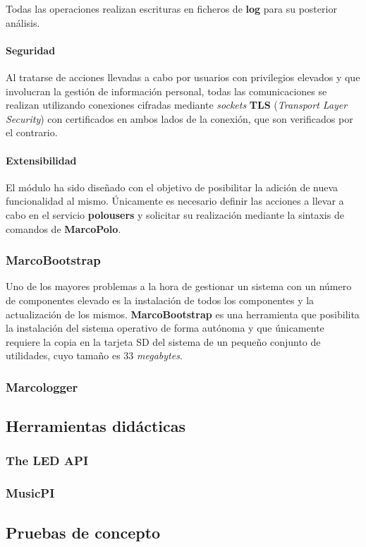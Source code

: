 Todas las operaciones realizan escrituras en ficheros de \textbf{log} para su posterior análisis.

\paragraph{Seguridad}

Al tratarse de acciones llevadas a cabo por usuarios con privilegios elevados y que involucran la gestión de información personal, todas las comunicaciones se realizan utilizando conexiones cifradas mediante \textit{sockets} \textbf{TLS} (\textit{Transport Layer Security}) con certificados en ambos lados de la conexión, que son verificados por el contrario.

\paragraph{Extensibilidad}

El módulo ha sido diseñado con el objetivo de posibilitar la adición de nueva funcionalidad al mismo. Únicamente es necesario definir las acciones a llevar a cabo en el servicio \textbf{polousers} y solicitar su realización mediante la sintaxis de comandos de \textbf{MarcoPolo}.

\subsubsection{MarcoBootstrap}

Uno de los mayores problemas a la hora de gestionar un sistema con un número de componentes elevado es la instalación de todos los componentes y la actualización de los mismos. \textbf{MarcoBootstrap} es una herramienta que posibilita la instalación del sistema operativo de forma autónoma y que únicamente requiere la copia en la tarjeta SD del sistema de un pequeño conjunto de utilidades, cuyo tamaño es 33 \textit{megabytes}.


\subsubsection{Marcologger}
\subsection{Herramientas didácticas}

\subsubsection{The LED API}

\subsubsection{MusicPI}


\subsection{Pruebas de concepto}

